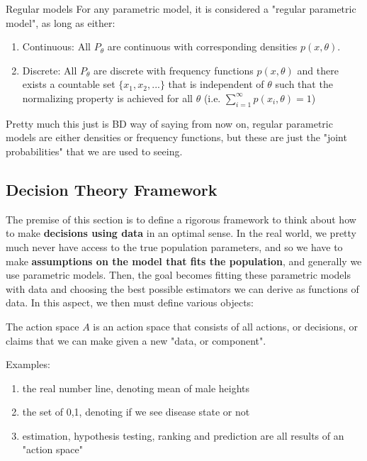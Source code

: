     \begin{definition}{Regular models}
    For any parametric model, it is considered a "regular parametric model", as long as either:

    \begin{enumerate}
      \item Continuous: All $P_\theta$ are continuous with corresponding densities $p(x, \theta)$.
      \item Discrete: All $P_\theta$ are discrete with frequency functions $p(x, \theta)$ and there exists a countable set $\{x_1, x_2, ...\}$ that is independent of $\theta$ such that the normalizing property is achieved for all $\theta$ (i.e. $\sum_{i=1}^\infty p(x_i, \theta) = 1$)
    \end{enumerate}

    Pretty much this just is BD way of saying from now on, regular parametric models are either densities or frequency functions, but these are just the "joint probabilities" that we are used to seeing.
    \end{definition}

  \subsection{Decision Theory Framework}

    The premise of this section is to define a rigorous framework to think about how to make \textbf{decisions using data} in an optimal sense. In the real world, we pretty much never have access to the true population parameters, and so we have to make \textbf{assumptions on the model that fits the population}, and generally we use parametric models. Then, the goal becomes fitting these parametric models with data and choosing the best possible estimators we can derive as functions of data. In this aspect, we then must define various objects:

    \begin{definition}{The action space}
    $A$ is an action space that consists of all actions, or decisions, or claims that we can make given a new "data, or component".

    Examples: 
    \begin{enumerate}
      \item the real number line, denoting mean of male heights
      \item the set of {0,1}, denoting if we see disease state or not
      \item estimation, hypothesis testing, ranking and prediction are all results of an "action space"
    \end{enumerate}
    \end{definition}

